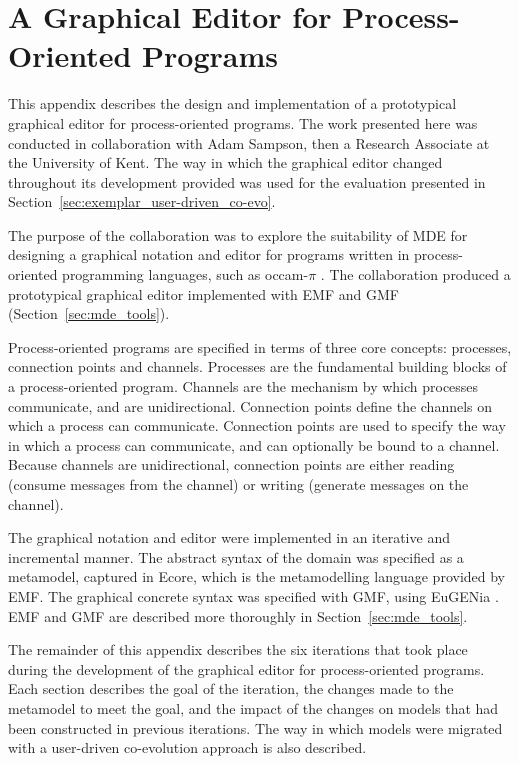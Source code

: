 
\chapter[A Graphical Editor for Process-Oriented Programs][A Graphical Model Editor]{A Graphical Editor for Process-Oriented Programs}
\label{ProcessOriented}

This appendix describes the design and implementation of a prototypical graphical editor for process-oriented programs. The work presented here was conducted in collaboration with Adam Sampson, then a Research Associate at the University of Kent. The way in which the graphical editor changed throughout its development provided was used for the evaluation presented in Section~\ref{sec:exemplar_user-driven_co-evo}.

The purpose of the collaboration was to explore the suitability of MDE  for designing a graphical notation and editor for programs written in process-oriented programming languages, such as occam-$\pi$ \cite{occam_pi}. The collaboration produced a prototypical graphical editor implemented with EMF and GMF (Section~\ref{sec:mde_tools}).

Process-oriented programs are specified in terms of three core concepts: processes, connection points and channels. Processes are the fundamental building blocks of a process-oriented program. Channels are the mechanism by which processes communicate, and are unidirectional. Connection points define the channels on which a process can communicate. Connection points are used to specify the way in which a process can communicate, and can optionally be bound to a channel. Because channels are unidirectional, connection points are either reading (consume messages from the channel) or writing (generate messages on the channel).

The graphical notation and editor were implemented in an iterative and incremental manner. The abstract syntax of the domain was specified as a metamodel, captured in Ecore, which is the metamodelling language provided by EMF. The graphical concrete syntax was specified with GMF, using EuGENia \cite{kolovos10eugenia}. EMF and GMF are described more thoroughly in Section~\ref{sec:mde_tools}.

The remainder of this appendix describes the six iterations that took place during the development of the graphical editor for process-oriented programs. Each section describes the goal of the iteration, the changes made to the metamodel to meet the goal, and the impact of the changes on models that had been constructed in previous iterations. The way in which models were migrated with a user-driven co-evolution approach is also described.

